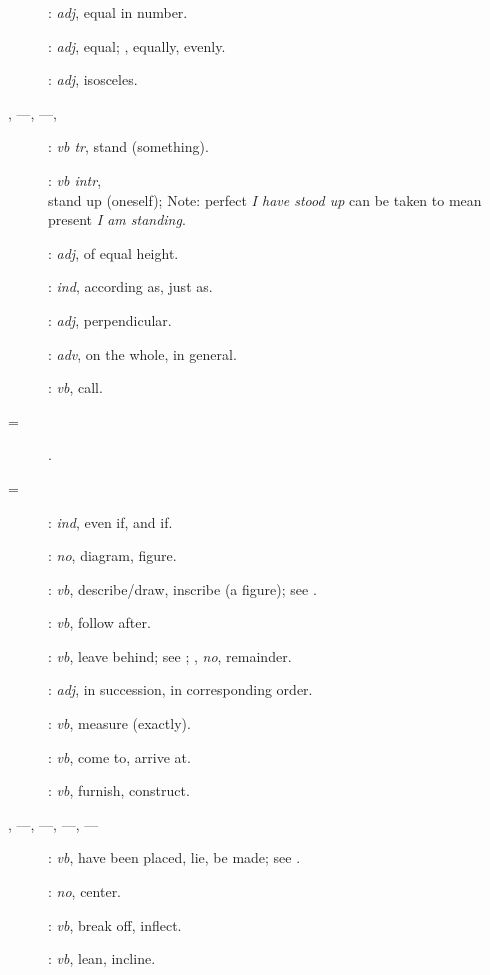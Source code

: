{\begin{description}
\item[]: {\em adj}, equal in number.
\item[]: {\em adj}, equal; , equally, evenly.
\item[]: {\em adj}, isosceles.
\item[, ---, ---, ]: {\em vb tr}, 
stand (something).
\item[]: {\em vb intr}, \\
stand up (oneself); Note: perfect {\em I have stood up} can be taken to mean present {\em I am standing}.
\item[]: {\em adj}, of equal height.
\item[]: {\em ind}, according as, just as.
\item[]: {\em adj}, perpendicular.
\item[]: {\em adv}, on the whole, in general.
\item[]: {\em vb}, call.
\item[ = ].
\item[ = ]: {\em ind}, even if, and if.
\item[]: {\em no}, diagram, figure.
\item[]: {\em vb}, describe/draw, inscribe (a figure); see .
\item[]: {\em vb}, follow after.
\item[] : {\em vb}, leave behind; see ; , {\em no},
remainder. 
\item[]: {\em adj}, in succession, in corresponding order.
\item[]: {\em vb}, measure (exactly).
\item[]: {\em vb}, come to, arrive at.
\item[]: {\em vb}, furnish, construct.
\item[, ---, ---, ---, ---]: {\em vb}, have been placed,
lie, be made; see .
\item[]: {\em no}, center.
\item[]: {\em vb}, break off, inflect.
\item[]: {\em vb}, lean, incline.

\end{description}}
